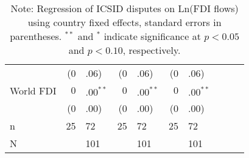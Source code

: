 \documentclass[12pt,onesided]{amsart}
\begin{document}
\begin{table}[ht]
{\begin{tabular}{lr@{} lr@{}lr@{}lr@{}lr@{}}
   & (0&.06) & (0&.06) & (0&.06) \\ 
  World FDI & $0$&$.00^{\ast\ast}$ & $0$&$.00^{\ast\ast}$ & $0$&$.00^{\ast\ast}$ \\ 
   & (0&.00) & (0&.00) & (0&.00) \\ 
   \hline
n & 25&72 & 25&72 & 25&72 \\ 
  N && 101 && 101 && 101 \\ 
   \hline
\hline
\end{tabular}
}
\caption*{Note: Regression of ICSID disputes on Ln(FDI flows) using country fixed effects, standard errors in parentheses. $^{**}$ and $^{*}$ indicate significance at $p< 0.05 $ and $p< 0.10 $, respectively.} 
\end{table}
\end{document}
